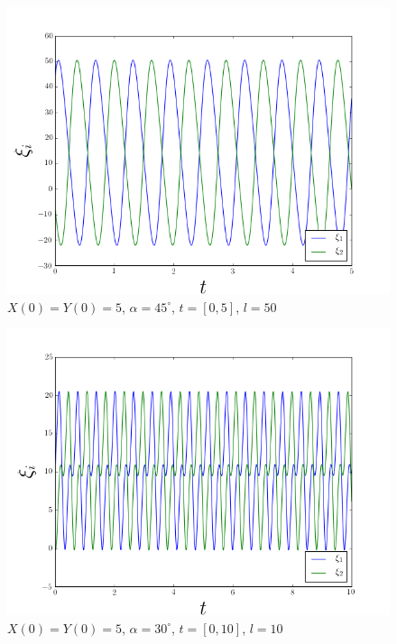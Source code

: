 \documentclass[a4paper,10pt]{article}
\numberwithin{equation}{section}
\begin{document}
\begin{figure}[H]
 \center 
 \includegraphics[scale=0.5]{problema1fig5}
 \caption{$X(0) = Y(0) = 5$, $\alpha = 45^\circ$, $t = [0,5]$, $l = 50$}
 \label{problema1fig5}
\end{figure}

\begin{figure}[H]
 \center 
 \includegraphics[scale=0.5]{problema1fig6}
 \caption{$X(0) = Y(0) = 5$, $\alpha = 30^\circ$, $t = [0,10]$, $l = 10$}
 \label{problema1fig6}
\end{figure}
\end{document}
